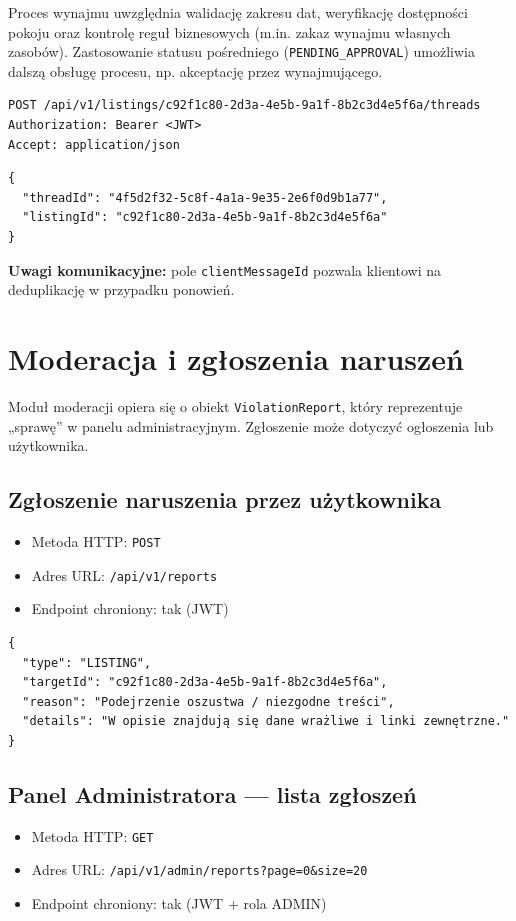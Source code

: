 \documentclass[11pt, a4paper]{article}
\begin{document}
Proces wynajmu uwzględnia walidację zakresu dat, weryfikację dostępności pokoju
oraz kontrolę reguł biznesowych (m.in. zakaz wynajmu własnych zasobów). Zastosowanie
statusu pośredniego (\texttt{PENDING\_APPROVAL}) umożliwia dalszą obsługę procesu,
np. akceptację przez wynajmującego.

\begin{lstlisting}[style=http,caption={Żądanie HTTP — utworzenie wątku}]
POST /api/v1/listings/c92f1c80-2d3a-4e5b-9a1f-8b2c3d4e5f6a/threads
Authorization: Bearer <JWT>
Accept: application/json
\end{lstlisting}

\begin{lstlisting}[style=json,caption={Odpowiedź — identyfikator wątku}]
{
  "threadId": "4f5d2f32-5c8f-4a1a-9e35-2e6f0d9b1a77",
  "listingId": "c92f1c80-2d3a-4e5b-9a1f-8b2c3d4e5f6a"
}
\end{lstlisting}

\noindent\textbf{Uwagi komunikacyjne:} pole \texttt{clientMessageId} pozwala klientowi na deduplikację w przypadku ponowień.

\section{Moderacja i zgłoszenia naruszeń}
Moduł moderacji opiera się o obiekt \texttt{ViolationReport}, który reprezentuje „sprawę” w panelu administracyjnym. Zgłoszenie może dotyczyć ogłoszenia lub użytkownika.

\subsection{Zgłoszenie naruszenia przez użytkownika}
\begin{itemize}
    \item Metoda HTTP: \texttt{POST}
    \item Adres URL: \texttt{/api/v1/reports}
    \item Endpoint chroniony: tak (JWT)
\end{itemize}

\begin{lstlisting}[style=json,caption={Ciało żądania — zgłoszenie naruszenia}]
{
  "type": "LISTING", 
  "targetId": "c92f1c80-2d3a-4e5b-9a1f-8b2c3d4e5f6a",
  "reason": "Podejrzenie oszustwa / niezgodne treści",
  "details": "W opisie znajdują się dane wrażliwe i linki zewnętrzne."
}
\end{lstlisting}

\subsection{Panel Administratora — lista zgłoszeń}
\begin{itemize}
    \item Metoda HTTP: \texttt{GET}
    \item Adres URL: \texttt{/api/v1/admin/reports?page=0\&size=20}
    \item Endpoint chroniony: tak (JWT + rola ADMIN)
\end{itemize}
\end{document}
